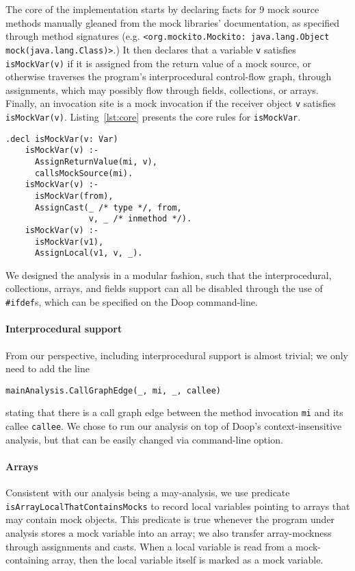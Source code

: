 The core of the implementation starts by declaring facts for 9 mock source methods manually gleaned from the mock libraries' documentation, as specified through method signatures (e.g. 
\texttt{<org.mockito.Mockito: java.lang.Object mock(java.lang.Class)>}.)
It then declares that a variable {\tt v} satisfies \verb+isMockVar(v)+ if it is assigned from the return value of a mock source, or otherwise traverses the program's interprocedural control-flow graph, through assignments, which may possibly flow through fields, collections, or arrays. Finally, an invocation site is a mock invocation if the receiver object {\tt v} satisfies \verb+isMockVar(v)+. Listing~\ref{lst:core} presents the core rules for {\tt isMockVar}.

\begin{lstlisting}[basicstyle=\ttfamily\small,numbers=none,label={lst:core},caption={Core rules for propagating mockness via predicate {\tt isMockVar}.}]
    .decl isMockVar(v: Var)
    isMockVar(v) :-
      AssignReturnValue(mi, v),
      callsMockSource(mi).
    isMockVar(v) :-
      isMockVar(from),
      AssignCast(_ /* type */, from, 
                 v, _ /* inmethod */).
    isMockVar(v) :-
      isMockVar(v1),
      AssignLocal(v1, v, _).
\end{lstlisting}

We designed the analysis in a modular fashion, such that the interprocedural, collections, arrays, and fields support can all be disabled through the use of \verb+#ifdef+s, which can be specified on the Doop command-line.

\paragraph{Interprocedural support} From our perspective, including interprocedural support is almost trivial; we only need to add the line 
\begin{lstlisting}[basicstyle=\ttfamily\small,numbers=none]
  mainAnalysis.CallGraphEdge(_, mi, _, callee)
\end{lstlisting}
stating that there is a call graph edge between the method invocation {\tt mi} and its callee {\tt callee}. We chose to run our analysis on top of Doop's context-insensitive analysis, but that can be easily changed via command-line option.

\paragraph{Arrays} Consistent with our analysis being a may-analysis, we use predicate {\tt isArrayLocalThatContainsMocks} to record local variables pointing to arrays that may contain mock objects. This predicate is true whenever the program under analysis stores a mock variable into an array; we also transfer array-mockness through assignments and casts. When a local variable is read from a mock-containing array, then the local variable itself is marked as a mock variable.

